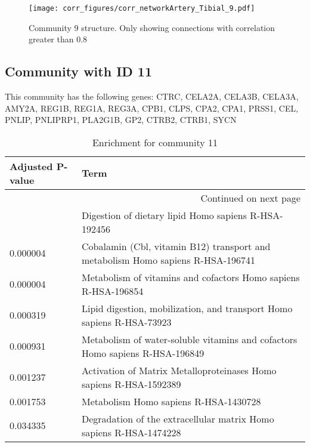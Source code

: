 \begin{figure}[h!]
\centering
\texttt{[image: corr\_figures/corr\_networkArtery\_Tibial\_9.pdf]}
\caption{Community 9 structure. Only showing connections with correlation greater than 0.8}
\end{figure}




\subsection*{Community with ID 11}
This community has the following genes: CTRC, CELA2A, CELA3B, CELA3A, AMY2A, REG1B, REG1A, REG3A, CPB1, CLPS, CPA2, CPA1, PRSS1, CEL, PNLIP, PNLIPRP1, PLA2G1B, GP2, CTRB2, CTRB1, SYCN
\\
\begin{longtable}{p{2.4cm}p{14.5cm}}
\caption{Enrichment for community 11}\\
\toprule
Adjusted \newline P-value &                                                                             Term \\
\midrule
\endhead
\midrule
\multicolumn{2}{r}{{Continued on next page}} \\
\midrule
\endfoot

\bottomrule
\endlastfoot
                 0.000003 &                             Digestion of dietary lipid Homo sapiens R-HSA-192456 \\
                 0.000004 &  Cobalamin (Cbl, vitamin B12) transport and metabolism Homo sapiens R-HSA-196741 \\
                 0.000004 &                   Metabolism of vitamins and cofactors Homo sapiens R-HSA-196854 \\
                 0.000319 &            Lipid digestion, mobilization, and transport Homo sapiens R-HSA-73923 \\
                 0.000931 &     Metabolism of water-soluble vitamins and cofactors Homo sapiens R-HSA-196849 \\
                 0.001237 &               Activation of Matrix Metalloproteinases Homo sapiens R-HSA-1592389 \\
                 0.001753 &                                            Metabolism Homo sapiens R-HSA-1430728 \\
                 0.034335 &               Degradation of the extracellular matrix Homo sapiens R-HSA-1474228 \\
\end{longtable}


